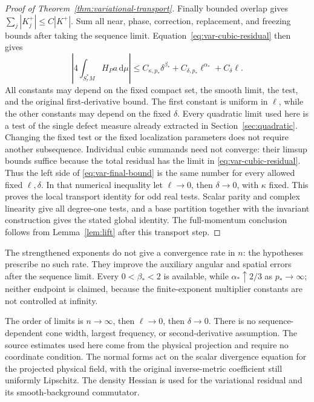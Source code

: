 \documentclass[11pt,a4paper]{article}
\numberwithin{equation}{section}
\newcommand{\dd}{\mathrm d}
\theoremstyle{definition}
\begin{document}
\begin{proof}[Proof of Theorem~\ref{thm:variational-transport}]
Finally bounded overlap gives $\sum_j|K_j^+|\leq C|K^+|$.
Sum all near, phase, correction, replacement, and freezing bounds
after taking the sequence limit. Equation~\eqref{eq:var-cubic-residual}
then gives
\begin{equation}\label{eq:var-final-bound}
\left|4\int_{S_r^*M}H_Pa\,\dd\mu\right|
\leq C_{\kappa,p_*}\delta^{\beta_*}
   +C_{\delta,p_*}\ell^{\alpha_*}+C_\delta\ell.
\end{equation}
All constants may depend on the fixed compact set, the smooth limit,
the test, and the original first-derivative bound. The first constant
is uniform in $\ell$, while the other constants may depend on the
fixed $\delta$. Every quadratic limit used here is a test of the
single defect measure already extracted in Section~\ref{sec:quadratic}.
Changing the fixed test or the fixed localization parameters does not
require another subsequence. Individual cubic summands need not converge:
their limsup bounds suffice because the total residual has the limit in
\eqref{eq:var-cubic-residual}. Thus the left side of
\eqref{eq:var-final-bound} is the same number for every allowed fixed
$\ell,\delta$. In that numerical inequality let $\ell\to0$, then
$\delta\to0$, with $\kappa$ fixed. This proves the local
transport identity for odd real
tests. Scalar parity and complex linearity give all degree-one tests,
and a base partition together with the invariant construction gives
the stated global identity. The full-momentum conclusion follows
from Lemma~\ref{lem:lift} after this transport step.
\end{proof}

The strengthened exponents do not give a convergence rate in $n$:
the hypotheses prescribe no such rate. They improve the auxiliary
angular and spatial errors after the sequence limit. Every
$0<\beta_*<2$ is available, while $\alpha_*\uparrow2/3$ as
$p_*\to\infty$; neither endpoint is claimed, because the finite-exponent
multiplier constants are not controlled at infinity.

The order of limits is $n\to\infty$, then $\ell\to0$, then
$\delta\to0$. There is no sequence-dependent cone width, largest
frequency, or second-derivative assumption. The source estimates used here come from the physical projection and
require no coordinate condition. The normal forms act on the scalar
divergence equation for the projected physical field, with the original
inverse-metric coefficient still uniformly Lipschitz. The density
Hessian is used for the variational residual and its smooth-background
commutator.
\end{document}
